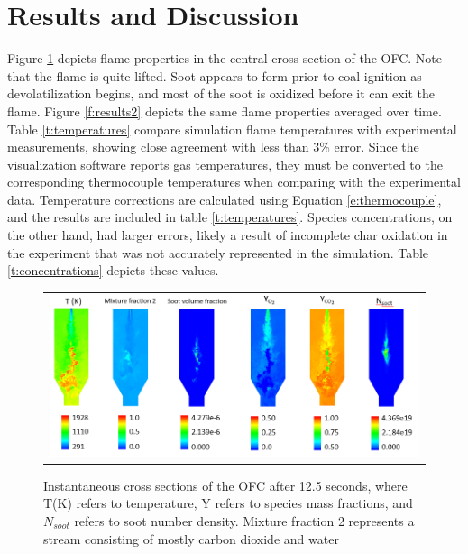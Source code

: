 \documentclass[review,3p]{elsarticle}
\begin{document}
\section{Results and Discussion}
%
Figure \ref{f:results1} depicts flame properties in the central cross-section of the OFC.  
Note that the flame is quite lifted.  Soot appears to form prior to coal ignition as devolatilization begins, and most of the soot is oxidized before it can exit the flame.  Figure \ref{f:results2} depicts the same flame properties averaged over time.  Table \ref{t:temperatures} compare simulation flame temperatures with experimental measurements, showing close agreement with less than 3\% error.  Since the visualization software reports gas temperatures, they must be converted to the corresponding thermocouple temperatures when comparing with the experimental data.   Temperature corrections are calculated using Equation \ref{e:thermocouple}, and the results are included in table \ref{t:temperatures}.  Species concentrations, on the other hand, had larger errors, likely a result of incomplete char oxidation in the experiment that was not accurately represented in the simulation.  Table \ref{t:concentrations} depicts these values.  

\begin{figure}[!h]
\begin{center}
\begin{tabular}{c}
\includegraphics[width=6 in]{../figures/resultsB.png}
\end{tabular}
\caption{Instantaneous cross sections of the OFC after 12.5 seconds, where T(K) refers to temperature, Y refers to species mass fractions, and $N_{soot}$ refers to soot number density.  Mixture fraction 2 represents a stream consisting of mostly carbon dioxide and water }
\label{f:results1}
\end{center}
\end{figure}
\end{document}

